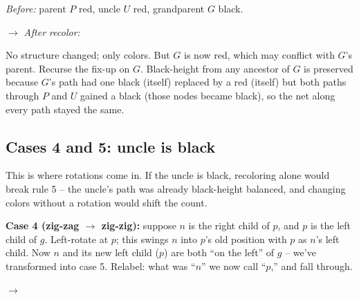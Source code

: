 \documentclass[11pt]{article}
\begin{document}
\begin{center}
\emph{Before:} parent $P$ red, uncle $U$ red, grandparent $G$ black.
\quad $\to$ \quad
\emph{After recolor:}
\end{center}

No structure changed; only colors. But $G$ is now red, which may conflict with $G$'s parent. Recurse the fix-up on $G$. Black-height from any ancestor of $G$ is preserved because $G$'s path had one black (itself) replaced by a red (itself) but both paths through $P$ and $U$ gained a black (those nodes became black), so the net along every path stayed the same.

\subsection*{Cases 4 and 5: uncle is black}

This is where rotations come in. If the uncle is black, recoloring alone would break rule 5 -- the uncle's path was already black-height balanced, and changing colors without a rotation would shift the count.

\textbf{Case 4 (zig-zag $\to$ zig-zig):} suppose $n$ is the right child of $p$, and $p$ is the left child of $g$. Left-rotate at $p$; this swings $n$ into $p$'s old position with $p$ as $n$'s left child. Now $n$ and its new left child ($p$) are both ``on the left'' of $g$ -- we've transformed into case 5. Relabel: what was ``$n$'' we now call ``$p$,'' and fall through.

\begin{center}
\quad $\to$ \quad
{}
\end{center}
\end{document}
